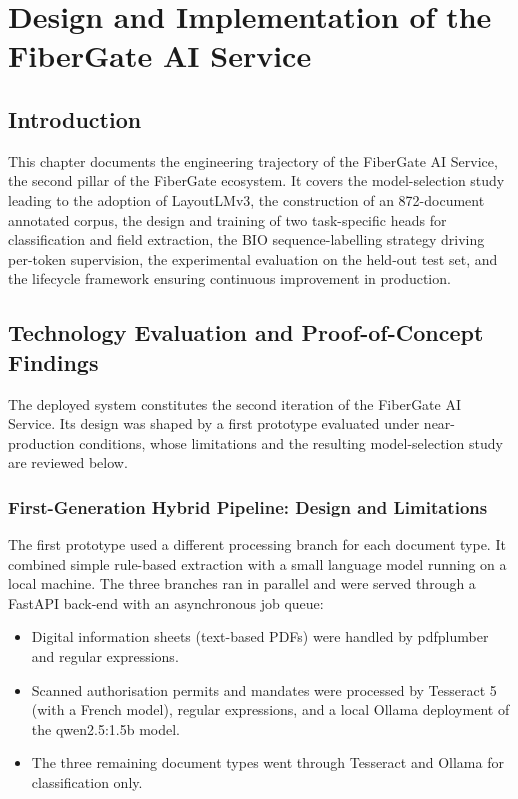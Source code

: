 \chapter{Design and Implementation of the FiberGate AI Service}

\section*{Introduction}

This chapter documents the engineering trajectory of the FiberGate AI Service, the second pillar of the FiberGate ecosystem. It covers the model-selection study leading to the adoption of LayoutLMv3, the construction of an 872-document annotated corpus, the design and training of two task-specific heads for classification and field extraction, the BIO sequence-labelling strategy driving per-token supervision, the experimental evaluation on the held-out test set, and the lifecycle framework ensuring continuous improvement in production.

\section{Technology Evaluation and Proof-of-Concept Findings}

The deployed system constitutes the second iteration of the FiberGate AI Service. Its design was shaped by a first prototype evaluated under near-production conditions, whose limitations and the resulting model-selection study are reviewed below.

\subsection{First-Generation Hybrid Pipeline: Design and Limitations}

The first prototype used a different processing branch for each document type. It combined simple rule-based extraction with a small language model running on a local machine. The three branches ran in parallel and were served through a FastAPI back-end with an asynchronous job queue:

\begin{itemize}
  \item Digital information sheets (text-based PDFs) were handled by pdfplumber and regular expressions.
  \item Scanned authorisation permits and mandates were processed by Tesseract 5 (with a French model), regular expressions, and a local Ollama deployment of the qwen2.5:1.5b model.
  \item The three remaining document types went through Tesseract and Ollama for classification only.
\end{itemize}

